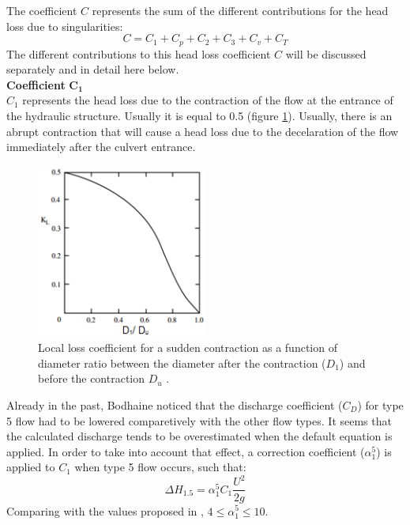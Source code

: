 The coefficient $C$ represents the sum of the different contributions for the
head loss due to singularities:
\begin{equation}
C=C_1+C_p+C_2+C_3+C_v+C_T
\end{equation}
The different contributions to this head loss coefficient $C$ will be discussed
separately and in detail here below.\\

\textbf{Coefficient} $\mathbf{C_1}$ \\
$C_1$ represents the head loss due to the contraction of the flow at the entrance
of the hydraulic structure.
Usually it is equal to 0.5 (figure \ref{fig:culvert_fig7}).
Usually, there is an abrupt contraction that will cause a head loss due to
the decelaration of the flow immediately after the culvert entrance.

\begin{figure}[H]
\begin{center}
  \includegraphics[width=0.5\textwidth]{graphics/culvert_fig7.png}
\end{center}
\caption{Local loss coefficient for a sudden contraction as
a function of diameter ratio between the diameter after the contraction ($D_1$)
and before the contraction $D_u$ \cite{Bruce2000}.}
\label{fig:culvert_fig7}
\end{figure}

Already in the past, Bodhaine \cite{Bodhaine1968} noticed that the discharge coefficient ($C_D$)
for type 5 flow had to be lowered comparetively with the other flow types.
It seems that the calculated discharge tends to be overestimated when the
default equation is applied. In order to take into account that effect,
a correction coefficient ($\alpha_1^5$) is applied to $C_1$ when type 5 flow occurs, such that:
\begin{equation}
\Delta H_{1.5}=\alpha_1^5 C_1  \dfrac{U^2}{2g}
\end{equation}
Comparing with the values proposed in \cite{Bodhaine1968}, $4 \le \alpha_1^5 \le 10$.\\

